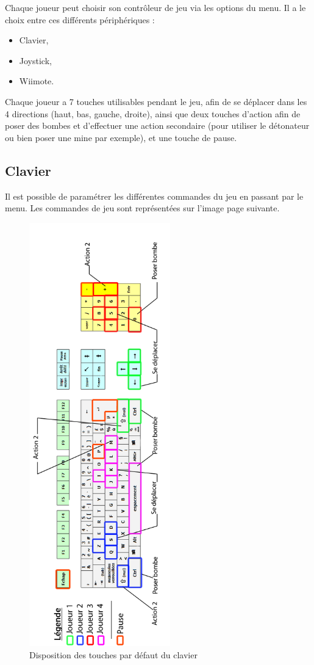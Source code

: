 Chaque joueur peut choisir son contrôleur de jeu via les options du menu. Il a le choix entre ces différents périphériques :

\begin{itemize}
    \item Clavier,
    \item Joystick,
    \item Wiimote.
\end{itemize}

\vspace{0.5cm}

Chaque joueur a 7 touches utilisables pendant le jeu, afin de se déplacer dans les 4 directions (haut, bas, gauche, droite), ainsi que deux touches d'action afin de poser des bombes et d'effectuer une action secondaire (pour utiliser le détonateur ou bien poser une mine par exemple), et une touche de pause.
	
\subsection{Clavier}

Il est possible de paramétrer les différentes commandes du jeu en passant par le menu. Les commandes de jeu sont représentées sur l'image page suivante.

\begin{figure}
    \begin{center}
	    \includegraphics[height=520pt]{images/clavier}
    \end{center}
    \caption{Disposition des touches par défaut du clavier}
\end{figure}

